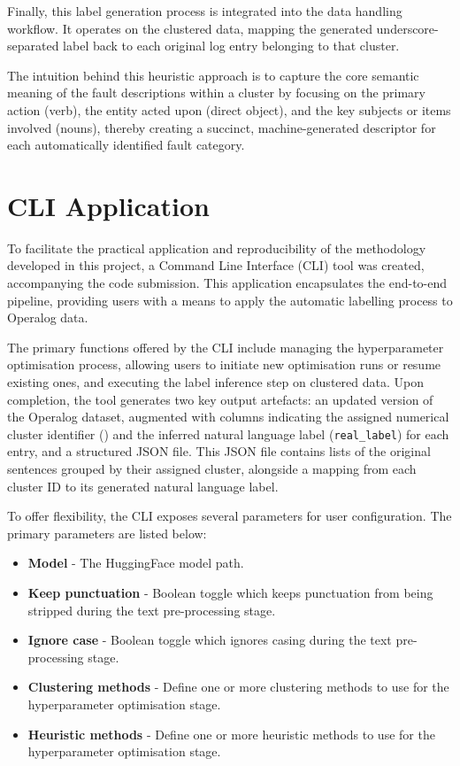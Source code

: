\documentclass[10pt,oneside]{report}
\begin{document}
Finally, this label generation process is integrated into the data handling workflow. It operates on the clustered data, mapping the generated underscore-separated label back to each original log entry belonging to that cluster.

The intuition behind this heuristic approach is to capture the core semantic meaning of the fault descriptions within a cluster by focusing on the primary action (verb), the entity acted upon (direct object), and the key subjects or items involved (nouns), thereby creating a succinct, machine-generated descriptor for each automatically identified fault category.

\section{CLI Application}\label{sec:CLI}

To facilitate the practical application and reproducibility of the methodology developed in this project, a Command Line Interface (CLI) tool was created, accompanying the code submission. This application encapsulates the end-to-end pipeline, providing users with a means to apply the automatic labelling process to Operalog data.

The primary functions offered by the CLI include managing the hyperparameter optimisation process, allowing users to initiate new optimisation runs or resume existing ones, and executing the label inference step on clustered data. Upon completion, the tool generates two key output artefacts: an updated version of the Operalog dataset, augmented with columns indicating the assigned numerical cluster identifier () and the inferred natural language label (\texttt{real\_label}) for each entry, and a structured JSON file. This JSON file contains lists of the original sentences grouped by their assigned cluster, alongside a mapping from each cluster ID to its generated natural language label.

To offer flexibility, the CLI exposes several parameters for user configuration. The primary parameters are listed below:
\begin{itemize}
    \item \textbf{Model} - The HuggingFace model path.
    \item \textbf{Keep punctuation} - Boolean toggle which keeps punctuation from being stripped during the text pre-processing stage.
    \item \textbf{Ignore case} - Boolean toggle which ignores casing during the text pre-processing stage.
    \item \textbf{Clustering methods} - Define one or more clustering methods to use for the hyperparameter optimisation stage. 
    \item \textbf{Heuristic methods} - Define one or more heuristic methods to use for the hyperparameter optimisation stage.
\end{itemize}
\end{document}
